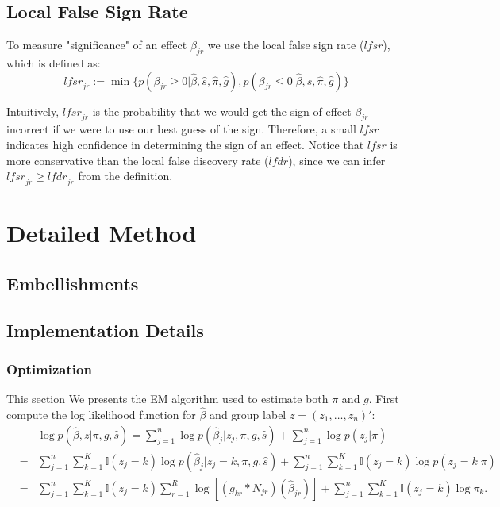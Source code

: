 \documentclass[11pt]{article}
\def\lfdr{\textit{lfdr}}
\def\lfsr{\textit{lfsr}}
\begin{document}
\subsection{Local False Sign Rate}

To measure "significance" of an effect $\beta_{jr}$ we use the local false sign rate ($\lfsr$), which is defined as:
\begin{equation}
    \lfsr_{jr} := \min\{p(\beta_{jr}\geq 0|\hat\beta,\hat s,\hat\pi,\hat g), p(\beta_{jr}\leq 0|\hat\beta,\hat s,\hat\pi,\hat g)\}
\end{equation}

Intuitively, $\lfsr_{jr}$ is the probability that we would get the sign of effect $\beta_{jr}$ incorrect if we were to use our best guess of the sign. Therefore, a small $\lfsr$ indicates high confidence in determining the sign of an effect. Notice that $\lfsr$ is more conservative than the local false discovery rate ($\lfdr$), since we can infer $\lfsr_{jr}\geq\lfdr_{jr}$ from the definition. 

\section{Detailed Method}

\subsection{Embellishments}

\subsection{Implementation Details} \label{sec:detail}

\subsubsection{Optimization}
This section We presents the EM algorithm used to estimate both $\pi$ and $g$. First compute the log likelihood function for $\hat\beta$ and group label $z=(z_1,\ldots,z_n)'$:
\begin{eqnarray}
    &&\log p(\hat\beta,z|\pi,g,\hat s) = \sum_{j=1}^n\log p(\hat\beta_j|z_j,\pi,g,\hat s)+\sum_{j=1}^n\log p(z_j|\pi) \nonumber\\
    &=& \sum_{j=1}^n\sum_{k=1}^K\mathbb{I}(z_j=k)\log p(\hat\beta_j|z_j=k,\pi,g,\hat s)
    +\sum_{j=1}^n\sum_{k=1}^K\mathbb{I}(z_j=k)\log p(z_j=k|\pi)\nonumber\\
    &=& \sum_{j=1}^n\sum_{k=1}^K\mathbb{I}(z_j=k)\sum_{r=1}^R\log \left[(g_{kr}*N_{jr})(\hat\beta_{jr}) \right]+\sum_{j=1}^n\sum_{k=1}^K\mathbb{I}(z_j=k)\log\pi_k.
\end{eqnarray}
\end{document}
